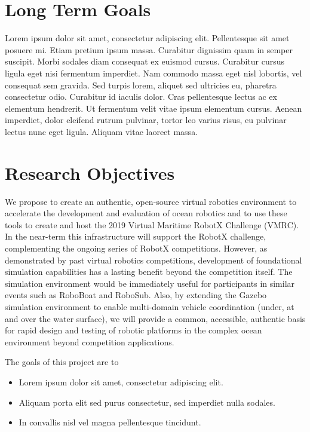 \documentclass[11pt]{article}
\DeclareRobustCommand{\hlr}[1]{{\sethlcolor{red}\hl{#1}}}
\DeclareRobustCommand{\hlg}[1]{{\sethlcolor{green}\hl{#1}}}
\DeclareRobustCommand{\hly}[1]{{\sethlcolor{yellow}\hl{#1}}}
\newif\ifnotes
\newenvironment{xitemize}{\begin{itemize}\addtolength{\itemsep}{-0.75em}}{\end{itemize}}
\begin{document}
\ifnotes
\begin{itemize}
\item Notes/requests for Brian G. (BG) are in \hlg{green}
\item Notes/requests for Brian B. (BB)are in \hlr{red}
\item General notes are in \hly{yellow}
\end{itemize}
\fi

\section{Long Term Goals}
Lorem ipsum dolor sit amet, consectetur adipiscing elit. Pellentesque sit amet posuere mi. Etiam pretium ipsum massa. Curabitur dignissim quam in semper suscipit. Morbi sodales diam consequat ex euismod cursus. Curabitur cursus ligula eget nisi fermentum imperdiet. Nam commodo massa eget nisl lobortis, vel consequat sem gravida. Sed turpis lorem, aliquet sed ultricies eu, pharetra consectetur odio. Curabitur id iaculis dolor. Cras pellentesque lectus ac ex elementum hendrerit. Ut fermentum velit vitae ipsum elementum cursus. Aenean imperdiet, dolor eleifend rutrum pulvinar, tortor leo varius risus, eu pulvinar lectus nunc eget ligula. Aliquam vitae laoreet massa.


\section{Research Objectives}
We propose to create an authentic, open-source virtual robotics environment to accelerate the development and evaluation of ocean robotics and to use these tools to create and host the 2019 Virtual Maritime RobotX Challenge (VMRC).  In the near-term this infrastructure will support the RobotX challenge, complementing the ongoing series of RobotX competitions.  However, as demonstrated by past virtual robotics competitions, development of foundational simulation capabilities has a lasting benefit beyond the competition itself.  The simulation environment would be immediately useful for participants in similar events such as RoboBoat and RoboSub.   Also, by extending the Gazebo simulation environment to enable multi-domain vehicle coordination (under, at and over the water surface), we will provide a common, accessible, authentic basis for rapid design and testing of robotic platforms in the complex ocean environment beyond competition applications.

The goals of this project are to
\begin{xitemize}
\item Lorem ipsum dolor sit amet, consectetur adipiscing elit.
\item Aliquam porta elit sed purus consectetur, sed imperdiet nulla sodales.
\item In convallis nisl vel magna pellentesque tincidunt.
\end{xitemize}
\end{document}
